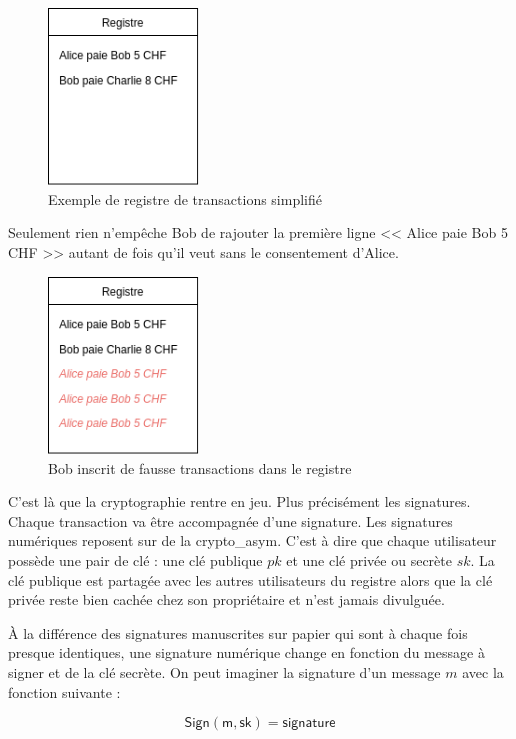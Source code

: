 \begin{figure}[H]
  \centering
  \includegraphics[width=4cm]{images/crypto_1.png}
  \caption{Exemple de registre de transactions simplifié}
\end{figure}

Seulement rien n'empêche Bob de rajouter la première ligne << Alice paie Bob 5 CHF >> autant de fois qu'il veut sans le consentement d'Alice.

\begin{figure}[H]
  \centering
  \includegraphics[width=4cm]{images/crypto_2.png}
  \caption{Bob inscrit de fausse transactions dans le registre}
\end{figure}

C'est là que la cryptographie rentre en jeu. Plus précisément les \glspl{signature}. Chaque transaction va être accompagnée d'une signature. Les signatures numériques reposent sur de la \gls{crypto_asym}. C'est à dire que chaque utilisateur possède une pair de clé : une clé publique $pk$ et une clé privée ou secrète $sk$. La clé publique est partagée avec les autres utilisateurs du registre alors que la clé privée reste bien cachée chez son propriétaire et n'est jamais divulguée.

À la différence des signatures manuscrites sur papier qui sont à chaque fois presque identiques, une signature numérique change en fonction du message à signer et de la clé secrète. On peut imaginer la signature d'un message $m$ avec la fonction suivante :

\begin{equation*}
  \mathsf{Sign(m, sk)} = \mathsf{signature}
\end{equation*}

